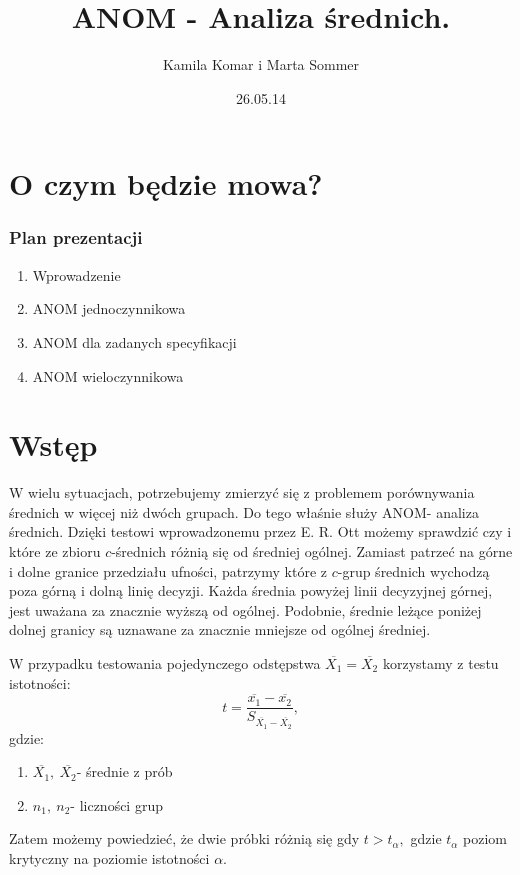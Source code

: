 \documentclass{beamer}
\title{ANOM - Analiza średnich.}
\author{Kamila Komar i Marta Sommer}
\date{26.05.14}
\begin{document}
	\begin{frame}
	\titlepage
	\end{frame}

\section{O czym będzie mowa?}
      \begin{frame}
	\frametitle{Plan prezentacji}

	\begin{enumerate}

		\item Wprowadzenie
		\pause
		\item ANOM jednoczynnikowa
		\pause
		\item ANOM dla zadanych specyfikacji
		\pause
		\item ANOM wieloczynnikowa

	\end{enumerate}
      \end{frame}

\section{Wstęp}

  \begin{frame}
 W wielu sytuacjach, potrzebujemy zmierzyć się z problemem porównywania średnich w więcej niż dwóch grupach. Do tego właśnie służy ANOM- analiza średnich. Dzięki testowi wprowadzonemu przez E. R. Ott możemy sprawdzić czy i które ze zbioru $c$-średnich różnią się od średniej ogólnej. Zamiast patrzeć na górne i dolne granice przedziału ufności, patrzymy które z $c$-grup średnich wychodzą poza górną i dolną linię decyzji. Każda średnia powyżej linii decyzyjnej górnej, jest uważana za znacznie wyższą od ogólnej. Podobnie, średnie leżące poniżej dolnej granicy są uznawane za znacznie mniejsze od ogólnej średniej.
\end{frame}     

  \begin{frame}
W przypadku testowania pojedynczego odstępstwa $\overline{X_1}=\overline{X_2}$  korzystamy z testu istotności:
$$ t=\frac{\overline{x_1}-\overline{x_2}}{S_{\overline{X_1}-\overline{X_2}}}, $$
  gdzie:
\begin{enumerate}
		\item[] $\overline{X_1},\ \overline{X_2}$- średnie z prób
		\item[] $n_1,\ n_2$- liczności grup
	\end{enumerate} 
	Zatem możemy powiedzieć, że dwie próbki różnią się gdy $t>t_{\alpha},$ gdzie $t_{\alpha}$ poziom krytyczny na poziomie istotności $\alpha.$
  \end{frame}
\end{document}
